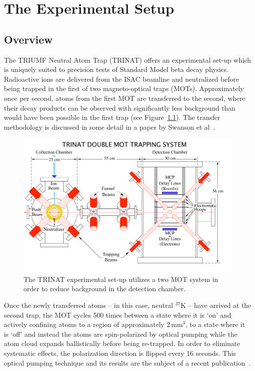 

\clearpage
\chapter{The Experimental Setup}
\label{setup_chapter}

\color{oldcolor}
\section{Overview}
The TRIUMF Neutral Atom Trap (TRINAT) offers an experimental set-up which is uniquely suited to precision tests of Standard Model beta decay physics.  Radioactive ions are delivered from the ISAC beamline and neutralized before being trapped in the first of two magneto-optical traps (MOTs).  Approximately once per second, atoms from the first MOT are transferred to the second, where their decay products can be observed with significantly less background than would have been possible in the first trap (see Figure~\ref{fig:doublemot}).  The transfer methodology is discussed in some detail in a paper by Swanson et al~\cite{swanson}. 

\begin{figure}[t!h]
	\centering
	\includegraphics[width=.999\linewidth]
	{Figures/doublemot4.pdf}
	\caption{The TRINAT experimental set-up utilizes a two MOT system in order to reduce background in the detection chamber.}	
	\label{fig:doublemot}
\end{figure}

Once the newly transferred atoms -- in this case, neutral $^{37}\textrm{K}$ -- have arrived at the second trap, the MOT cycles 500 times between a state where it is `on' and actively confining atoms to a region of approximately 2\,mm$^3$, to a state where it is `off' and instead the atoms are spin-polarized by optical pumping while the atom cloud expands ballistically before being re-trapped.  In order to eliminate systematic effects, the polarization direction is flipped every 16 seconds.  This optical pumping technique and its results are the subject of a recent publication~\cite{ben_OP}.

